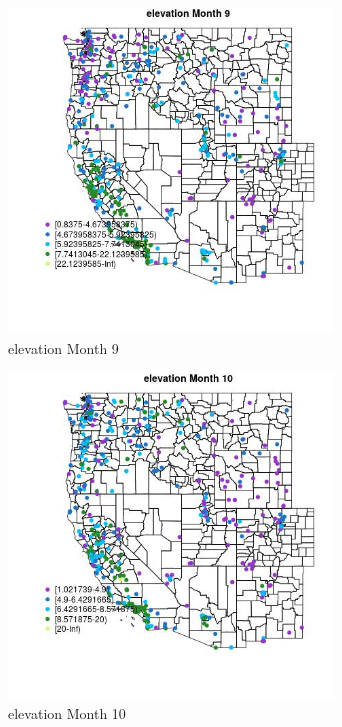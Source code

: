\begin{figure} 
\centering  
\includegraphics[width=0.77\textwidth]{Code_Outputs/ML_input_report_ML_input_PM25_Step5_part_d_de_duplicated_aves_ML_input_MapObsMo9elevation.jpg} 
\caption{\label{fig:ML_input_report_ML_input_PM25_Step5_part_d_de_duplicated_aves_ML_inputMapObsMo9elevation}elevation Month 9} 
\end{figure} 
 

\begin{figure} 
\centering  
\includegraphics[width=0.77\textwidth]{Code_Outputs/ML_input_report_ML_input_PM25_Step5_part_d_de_duplicated_aves_ML_input_MapObsMo10elevation.jpg} 
\caption{\label{fig:ML_input_report_ML_input_PM25_Step5_part_d_de_duplicated_aves_ML_inputMapObsMo10elevation}elevation Month 10} 
\end{figure} 
 

